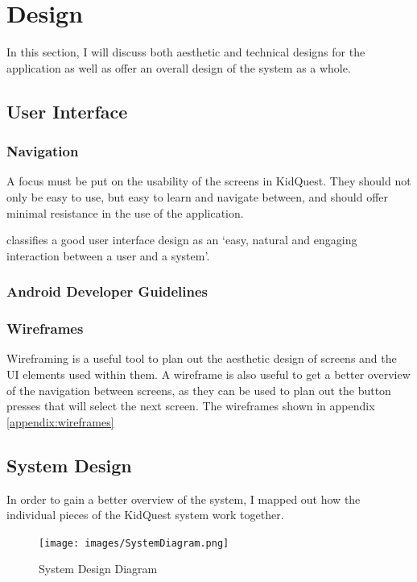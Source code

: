 \chapter{Design}
In this section, I will discuss both aesthetic and technical designs for the application as well as offer an overall design of the system as a whole.

\section{User Interface}
\subsection{Navigation}
A focus must be put on the usability of the screens in KidQuest.
They should not only be easy to use, but easy to learn and navigate between, and should offer minimal resistance in the use of the application.

\cite{stone2005user} classifies a good user interface design as an `easy, natural and engaging interaction between a user and a system'.

\subsection{Android Developer Guidelines}

\subsection{Wireframes}
Wireframing is a useful tool to plan out the aesthetic design of screens and the UI elements used within them. 
A wireframe is also useful to get a better overview of the navigation between screens, as they can be used to plan out the button presses that will select the next screen.
The wireframes shown in appendix \ref{appendix:wireframes}


\section{System Design}
In order to gain a better overview of the system, I mapped out how the individual pieces of the KidQuest system work together.

\begin{figure}[ht]
	\centering
	\texttt{[image: images/SystemDiagram.png]}
	\caption{System Design Diagram}
	\label{fig:systemdesign}
\end{figure} 

